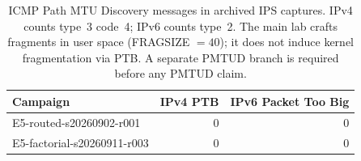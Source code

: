 \begin{table}[t]
\centering
\caption{ICMP Path MTU Discovery messages in archived IPS captures. IPv4 counts type~3 code~4; IPv6 counts type~2. The main lab crafts fragments in user space (FRAGSIZE $=40$); it does not induce kernel fragmentation via PTB. A separate PMTUD branch is required before any PMTUD claim.}
\label{tab:icmp-ptb-audit}
\begingroup
\fontsize{9}{10.8}\selectfont
\setlength{\tabcolsep}{3pt}
\begin{tabular}{lrr}
\hline
Campaign & IPv4 PTB & IPv6 Packet Too Big \\
\hline
E5-routed-s20260902-r001 & 0 & 0 \\
E5-factorial-s20260911-r003 & 0 & 0 \\
\hline
\end{tabular}
\endgroup
\end{table}

